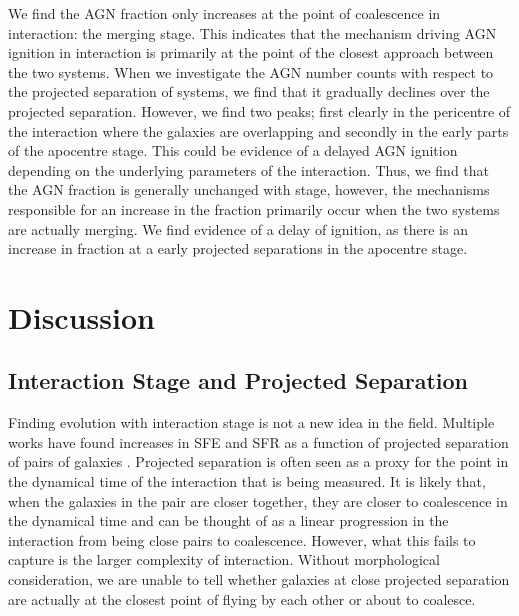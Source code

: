 We find the AGN fraction only increases at the point of coalescence in interaction: the merging stage. This indicates that the mechanism driving AGN ignition in interaction is primarily at the point of the closest approach between the two systems. When we investigate the AGN number counts with respect to the projected separation of systems, we find that it gradually declines over the projected separation. However, we find two peaks; first clearly in the pericentre of the interaction where the galaxies are overlapping and secondly in the early parts of the apocentre stage. This could be evidence of a delayed AGN ignition depending on the underlying parameters of the interaction. Thus, we find that the AGN fraction is generally unchanged with stage, however, the mechanisms responsible for an increase in the fraction primarily occur when the two systems are actually merging. We find evidence of a delay of ignition, as there is an increase in fraction at a early projected separations in the apocentre stage.

\section{Discussion}\label{discussion}
\subsection{Interaction Stage and Projected Separation}
\noindent Finding evolution with interaction stage is not a new idea in the field. Multiple works have found increases in SFE and SFR as a function of projected separation of pairs of galaxies \citep{2000ApJ...530..660B, 2008AJ....135.1877E, 2013MNRAS.433L..59P}. Projected separation is often seen as a proxy for the point in the dynamical time of the interaction that is being measured. It is likely that, when the galaxies in the pair are closer together, they are closer to coalescence in the dynamical time and can be thought of as a linear progression in the interaction from being close pairs to coalescence. However, what this fails to capture is the larger complexity of interaction. Without morphological consideration, we are unable to tell whether galaxies at close projected separation are actually  at the closest point of flying by each other or about to coalesce.

